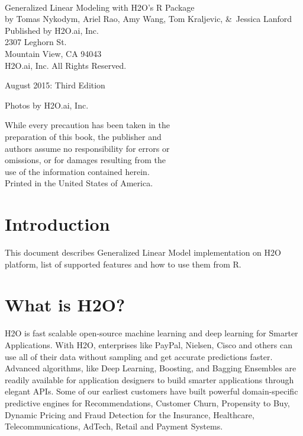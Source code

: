 \documentclass[11pt]{article}
\begin{document}
{\raggedright\vfill\ 

Generalized Linear Modeling  with H2O's R Package\\
  by Tomas Nykodym, Ariel Rao, Amy Wang, Tom Kraljevic, \&\ Jessica Lanford \\
\bigskip
  Published by H2O.ai, Inc. \\
2307 Leghorn St. \\
Mountain View, CA 94043\\
\bigskip
{} H2O.ai, Inc. All Rights Reserved. 
\bigskip

August 2015: Third Edition
\bigskip

Photos by \textcopyright H2O.ai, Inc. 
\bigskip

While every precaution has been taken in the\\
preparation of this book, the publisher and\\
authors assume no responsibility for errors or\\
omissions, or for damages resulting from the\\
use of the information contained herein.\\
\bigskip
Printed in the United States of America. 


}\par

\newpage

\tableofcontents


\newpage

\section{Introduction} \label{1}
This document describes Generalized Linear Model implementation on H2O platform, list of supported features and how to use them from R. 


\section{What is H2O?}

H2O is fast scalable open-source machine learning and deep learning for Smarter Applications. With H2O, enterprises like PayPal, Nielsen, Cisco and others can use all of their data without sampling and get accurate predictions faster. Advanced algorithms, like Deep Learning, Boosting, and Bagging Ensembles are readily available for application designers to build smarter applications through elegant APIs. Some of our earliest customers have built powerful domain-specific predictive engines for Recommendations, Customer Churn, Propensity to Buy, Dynamic Pricing and Fraud Detection for the Insurance, Healthcare, Telecommunications, AdTech, Retail and Payment Systems.
\end{document}
